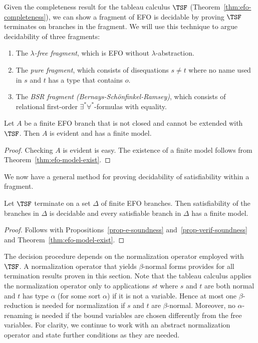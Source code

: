 Given the completeness result for the tableau calculus $\TSF$
(Theorem~\ref{thm:efo-completeness}),
we can show a fragment of EFO is decidable by proving $\TSF$
terminates on branches in the fragment.  We will use this technique to argue
decidability of three fragments:
\begin{enumerate}[$\bullet$]
\item The \emph{$\lambda$-free fragment}, which is EFO without $\lambda$-abstraction.
\item The \emph{pure fragment}, which consists of disequations $s\neq t$ where no name used in $s$ and $t$ has a type that contains $o$.
\item The \emph{BSR fragment (Bernays-Sch\"onfinkel-Ramsey)}, which consists of relational first-order $\exists^*\forall^*$-formulas with equality.
\end{enumerate}

\begin{prop}
  \label{prop-verif-soundness}
  Let $A$ be a finite EFO branch that is not closed and
  cannot be extended with $\TSF$.  Then $A$
  is evident and has a finite model.
\end{prop}
\begin{proof}
  Checking $A$ is evident is easy.  The existence of a finite model follows from Theorem~\ref{thm:efo-model-exist}.
\end{proof}

We now have a general method for proving decidability of satisfiability
within a fragment.

\begin{prop}
  Let $\TSF$ terminate on a set $\Delta$ of finite
  EFO branches.  Then satisfiability of the branches in
  $\Delta$ is decidable and every satisfiable branch in
  $\Delta$ has a finite model.
\end{prop}

\begin{proof}
  Follows with Propositions~\ref{prop-e-soundness}
  and~\ref{prop-verif-soundness} and
  Theorem~\ref{thm:efo-model-exist}.
\end{proof}

The decision procedure depends on the normalization
operator employed with $\TSF$.  A normalization
operator that yields $\beta$-normal forms provides for
all termination results proven in this section.  Note
that the tableau calculus applies the normalization
operator only to applications $st$ where $s$ and $t$
are both normal and $t$ has type $\alpha$ (for some sort $\alpha$) if it is not a
variable.  Hence at most one $\beta$-reduction is
needed for normalization if $s$ and $t$ are
$\beta$-normal.  Moreover, no $\alpha$-renaming is
needed if the bound variables are chosen differently
from the free variables.  For clarity, we continue to
work with an abstract normalization operator and state
further conditions as they are needed.

